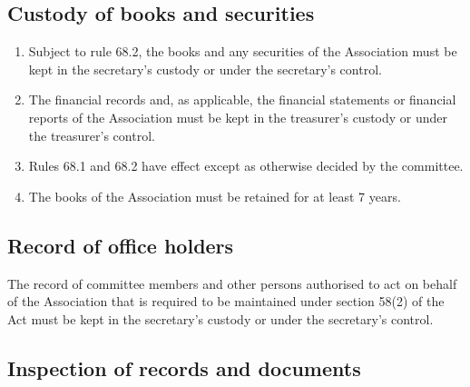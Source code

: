\documentclass[../constitution.tex]{subfiles}
\begin{document}
\hypertarget{custody-of-books-and-securities}{%
\subsection{Custody of books and securities}\label{custody-of-books-and-securities}}

\begin{enumerate}

\item Subject to rule 68.2, the books and any securities of the Association must be kept in the secretary's custody or under the secretary's control.
\item The financial records and, as applicable, the financial statements or financial reports of the Association must be kept in the treasurer's custody or under the treasurer's control.
\item Rules 68.1 and 68.2 have effect except as otherwise decided by the committee.
\item The books of the Association must be retained for at least 7 years.
\end{enumerate}

\hypertarget{record-of-office-holders}{%
\subsection{Record of office holders}\label{record-of-office-holders}}

The record of committee members and other persons authorised to act on behalf of the Association that is required to be maintained under section 58(2) of the Act must be kept in the secretary's custody or under the secretary's control.

\hypertarget{inspection-of-records-and-documents}{%
\subsection{Inspection of records and documents}\label{inspection-of-records-and-documents}}
\end{document}
